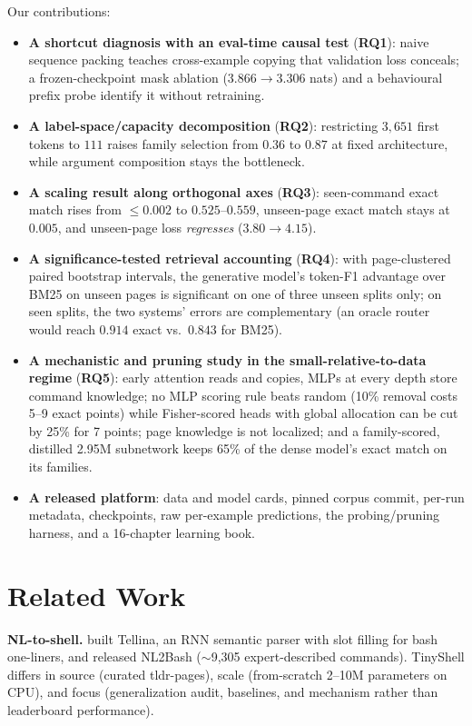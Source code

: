 \documentclass[11pt,a4paper]{article}
\newcommand{\modelname}{TinyShell}
\newcommand{\RQ}[1]{\textbf{RQ#1}}
\begin{document}
\noindent Our contributions:
\begin{itemize}
\item \textbf{A shortcut diagnosis with an eval-time causal test} (\RQ{1}):
  naive sequence packing teaches cross-example copying that validation loss
  conceals; a frozen-checkpoint mask ablation ($3.866\!\to\!3.306$ nats) and a
  behavioural prefix probe identify it without retraining.
\item \textbf{A label-space/capacity decomposition} (\RQ{2}): restricting
  $3{,}651$ first tokens to $111$ raises family selection from $0.36$ to
  $0.87$ at fixed architecture, while argument composition stays the
  bottleneck.
\item \textbf{A scaling result along orthogonal axes} (\RQ{3}): seen-command
  exact match rises from $\leq\!0.002$ to $0.525$--$0.559$, unseen-page exact
  match stays at $0.005$, and unseen-page loss \emph{regresses}
  ($3.80\!\to\!4.15$).
\item \textbf{A significance-tested retrieval accounting} (\RQ{4}): with
  page-clustered paired bootstrap intervals, the generative model's token-F1
  advantage over BM25 on unseen pages is significant on one of three unseen
  splits only; on seen splits, the two systems' errors are complementary
  (an oracle router would reach $0.914$ exact vs.\ $0.843$ for BM25).
\item \textbf{A mechanistic and pruning study in the small-relative-to-data
  regime} (\RQ{5}): early attention reads and copies, MLPs at every depth store
  command knowledge; no MLP scoring rule beats random (10\% removal costs 5--9
  exact points) while Fisher-scored heads with global allocation can be cut by
  25\% for 7 points; page knowledge is not localized; and a family-scored,
  distilled 2.95M subnetwork keeps 65\% of the dense model's exact match on its
  families.
\item \textbf{A released platform}: data and model cards, pinned corpus
  commit, per-run metadata, checkpoints, raw per-example predictions, the
  probing/pruning harness, and a 16-chapter learning book.
\end{itemize}

\section{Related Work}
\label{sec:related}

\textbf{NL-to-shell.} \citet{lin2017tellina} built Tellina, an RNN semantic
parser with slot filling for bash one-liners, and \citet{lin2018nl2bash}
released NL2Bash ($\sim$9{,}305 expert-described commands). \modelname{}
differs in source (curated tldr-pages), scale (from-scratch 2--10M parameters
on CPU), and focus (generalization audit, baselines, and mechanism rather than
leaderboard performance).
\end{document}
